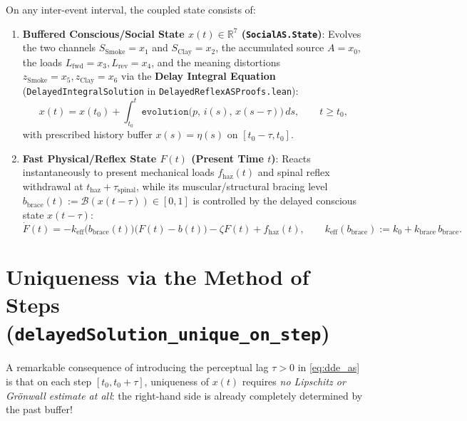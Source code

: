 \documentclass[11pt,a4paper]{article}
\theoremstyle{definition}
\begin{document}
On any inter-event interval, the coupled state consists of:
\begin{enumerate}
  \item \textbf{Buffered Conscious/Social State $x(t) \in \mathbb{R}^7$ (\texttt{SocialAS.State})}: Evolves the two channels $S_{\mathrm{Smoke}} = x_1$ and $S_{\mathrm{Clay}} = x_2$, the accumulated source $A = x_0$, the loads $L_{\mathrm{fwd}} = x_3, L_{\mathrm{rev}} = x_4$, and the meaning distortions $z_{\mathrm{Smoke}} = x_5, z_{\mathrm{Clay}} = x_6$ via the \textbf{Delay Integral Equation} (\texttt{DelayedIntegralSolution} in \texttt{DelayedReflexASProofs.lean}):
  \begin{equation}
    x(t) = x(t_0) + \int_{t_0}^t \texttt{evolution}\big(p,\, i(s),\, x(s - \tau)\big)\,ds, \qquad t \ge t_0,
    \label{eq:dde_as}
  \end{equation}
  with prescribed history buffer $x(s) = \eta(s)$ on $[t_0 - \tau, t_0]$.
  \item \textbf{Fast Physical/Reflex State $F(t)$ (Present Time $t$)}: Reacts instantaneously to present mechanical loads $f_{\mathrm{haz}}(t)$ and spinal reflex withdrawal at $t_{\mathrm{haz}} + \tau_{\mathrm{spinal}}$, while its muscular/structural bracing level $b_{\mathrm{brace}}(t) := \mathcal{B}(x(t - \tau)) \in [0, 1]$ is controlled by the delayed conscious state $x(t - \tau)$:
  \begin{equation}
    \dot{F}(t) = -k_{\mathrm{eff}}\big(b_{\mathrm{brace}}(t)\big)\big(F(t) - b(t)\big) - \zeta F(t) + f_{\mathrm{haz}}(t), \qquad
    k_{\mathrm{eff}}(b_{\mathrm{brace}}) := k_0 + k_{\mathrm{brace}}\,b_{\mathrm{brace}}.
    \label{eq:fast_F}
  \end{equation}
\end{enumerate}

\section{\texorpdfstring{Uniqueness via the Method of Steps (\texttt{delayedSolution\_unique\_on\_step})}{Uniqueness via the Method of Steps}}

A remarkable consequence of introducing the perceptual lag $\tau > 0$ in \eqref{eq:dde_as} is that on each step $[t_0, t_0 + \tau]$, uniqueness of $x(t)$ requires \emph{no Lipschitz or Gr\"onwall estimate at all}: the right-hand side is already completely determined by the past buffer!
\end{document}
